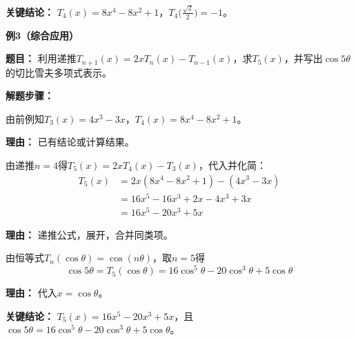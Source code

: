 \begin{examplebox}
	\textbf{\textcolor{CExample}{关键结论：}}
	$T_4(x)=8x^4-8x^2+1$，$T_4\bigl(\frac{\sqrt2}{2}\bigr)=-1$。

	\medskip
	\textbf{\textcolor{CExample}{例3（综合应用）}}

	\textbf{\textcolor{CExample}{题目：}}
	利用递推$T_{n+1}(x)=2xT_n(x)-T_{n-1}(x)$，求$T_5(x)$，并写出$\cos5\theta$的切比雪夫多项式表示。

	\textbf{\textcolor{CExample}{解题步骤：}}
	\begin{description}[style=nextline, leftmargin=2.8em, labelsep=0.5em, itemsep=0.45em]
		\item[\textbf{第一步（引用已知项）：}] 由前例知$T_3(x)=4x^3-3x$，$T_4(x)=8x^4-8x^2+1$。
			\par\textbf{理由：} 已有结论或计算结果。
		\item[\textbf{第二步（递推求五代简）：}] 由递推$n=4$得$T_5(x)=2xT_4(x)-T_3(x)$，代入并化简：
			\[
				\begin{aligned}
					T_5(x) &= 2x(8x^4-8x^2+1)-(4x^3-3x) \\
					&= 16x^5-16x^3+2x-4x^3+3x \\
					&= 16x^5-20x^3+5x
			\end{aligned}
			\]
			\par\textbf{理由：} 递推公式，展开，合并同类项。
		\item[\textbf{第三步（三角表示）：}] 由恒等式$T_n(\cos\theta)=\cos(n\theta)$，取$n=5$得
			\[
				\cos5\theta = T_5(\cos\theta) = 16\cos^5\theta -20\cos^3\theta +5\cos\theta
			\]
			\par\textbf{理由：} 代入$x=\cos\theta$。
	\end{description}

	\textbf{\textcolor{CExample}{关键结论：}}
	$T_5(x)=16x^5-20x^3+5x$，且$\cos5\theta = 16\cos^5\theta -20\cos^3\theta +5\cos\theta$。
\end{examplebox}
